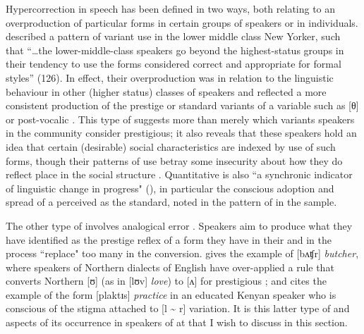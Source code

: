 Hypercorrection in speech has been defined in two ways, both relating to an overproduction of particular forms in certain groups of speakers or in individuals.  \citet{Labov1972} described a pattern of variant use in the lower middle class New Yorker, such that “{\ldots}the lower-middle-class speakers go beyond the highest-status groups in their tendency to use the forms considered correct and appropriate for formal styles” (126).  In effect, their overproduction was in relation to the linguistic behaviour in other (higher status) classes of speakers and reflected a more consistent production of the prestige or standard variants of a variable such as [θ] or post-vocalic .  This type of  suggests more than merely which variants speakers in the community consider prestigious; it also reveals that these speakers hold an idea that certain (desirable) social characteristics are indexed by use of such forms, though their patterns of use betray some insecurity about how they do reflect place in the social structure \citep[138]{Silverstein2000}.   Quantitative  is also ``a synchronic indicator of linguistic change in progress" (\citealt[245]{Labov1968}), in particular the conscious adoption and spread of a perceived  as the standard, noted in the pattern of  in the  sample.     

  The other type of  involves analogical error \citep[117]{Preston1989}.  Speakers aim to produce what they have identified as the prestige reflex of a form they have in their  and in the process ``replace" too many in the conversion.  \citet[66]{Trudgill1986} gives the example of [bʌʧr] \textit{butcher}, where speakers of Northern dialects of English have over-applied a rule that converts Northern [ʊ] (as in [lʊv] \textit{love}) to [ʌ] for prestigious ; and \citet[277]{Bobda2001} cites the example of the form [plaktɪs] \textit{practice} in an educated Kenyan speaker who is conscious of the stigma attached to [l {\textasciitilde} r] variation.  It is this latter type of  \citep{Janda1992} and aspects of its occurrence in speakers of  at  that I wish to discuss in this section.  

